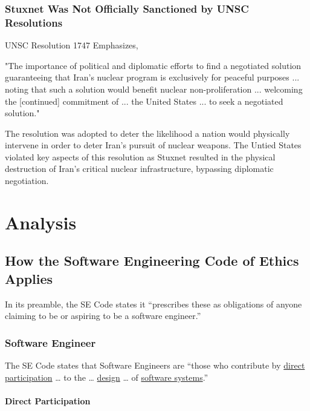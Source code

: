 \documentclass[12pt]{article}
\begin{document}
\begin{multicols}{2}
\subsubsection{Stuxnet Was Not Officially Sanctioned by UNSC Resolutions}

UNSC Resolution 1747 Emphasizes,
\begin{displayquote}
"The importance of political and diplomatic efforts to find a negotiated solution guaranteeing that Iran’s nuclear program is exclusively for peaceful purposes ... noting that such a solution would benefit nuclear non-proliferation ... welcoming the [continued] commitment of ... the United States ... to seek a negotiated solution."\cite{resolution1747}
\end{displayquote}

The resolution was adopted to deter the likelihood a nation would physically intervene in order to deter Iran's pursuit of nuclear weapons. The Untied States violated key aspects of this resolution as Stuxnet resulted in the physical destruction of Iran's critical nuclear infrastructure, bypassing diplomatic negotiation.


\section{Analysis}

\subsection{How the Software Engineering Code of Ethics Applies}

In its preamble, the SE Code states it “prescribes these as obligations of anyone claiming to be or aspiring to be a software engineer.”\cite{softwareEngineeringCodeOfEthics}

\subsubsection{Software Engineer}

The SE Code states that Software Engineers are “those who contribute by \underline{direct participation} … to the … \underline{design} … of \underline{software systems}.”\cite{softwareEngineeringCodeOfEthics}

\paragraph{Direct Participation}


\end{multicols}
\end{document}
